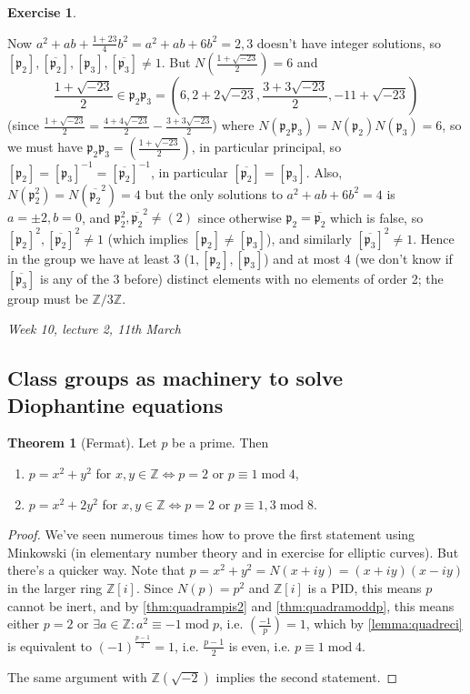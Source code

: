 \documentclass{article}
\newcommand{\Z}{\mathbb{Z}}
\newcommand{\Mod}{\operatorname{mod}}
\newcommand{\ip}{\mathfrak{p}}
\theoremstyle{definition}
\newtheorem{thm}[defn]{Theorem}
\newtheorem{exe}[defn]{Exercise}
\begin{document}
\begin{exe}
\begin{enumerate}
Now $a^2+ab+\frac{1+23}{4}b^2=a^2+ab+6b^2=2,3$ doesn't have integer solutions, so $[\ip_2],[\overline{\ip_2}],[\ip_3],[\overline{\ip_3}]\neq 1$. But $N\left(\frac{1+\sqrt{-23}}{2}\right)=6$ and
\[
\frac{1+\sqrt{-23}}{2}\in\ip_2\ip_3=\left(6,2+2\sqrt{-23},\frac{3+3\sqrt{-23}}{2},-11+\sqrt{-23}\right)
\]
(since $\frac{1+\sqrt{-23}}{2}=\frac{4+4\sqrt{-23}}{2}-\frac{3+3\sqrt{-23}}{2}$)
where $N(\ip_2\ip_3)=N(\ip_2)N(\ip_3)=6$, so we must have $\ip_2\ip_3=\left(\frac{1+\sqrt{-23}}{2}\right)$, in particular principal, so $[\ip_2]=[\ip_3]^{-1}=[\overline{\ip_2}]^{-1}$, in particular $[\overline{\ip_2}]=[\ip_3]$. Also, $N(\ip_2^2)=N(\overline{\ip_2}^2)=4$ but the only solutions to $a^2+ab+6b^2=4$ is $a=\pm 2,b=0$, and $\ip_2^2,\overline{\ip_2}^2\neq (2)$ since otherwise $\ip_2=\overline{\ip_2}$ which is false, so $[\ip_2]^2,[\overline{\ip_2}]^2\neq 1$ (which implies $[\ip_2]\neq [\ip_3]$), and similarly $[\overline{\ip_3}]^2\neq 1$. Hence in the group we have at least 3 ($1,[\ip_2],[\ip_3]$) and at most 4 (we don't know if $[\overline{\ip_3}]$ is any of the 3 before) distinct elements with no elements of order 2; the group must be $\Z/3\Z$.
\end{enumerate}
\end{exe}

\begin{flushright}
\textit{Week 10, lecture 2, 11th March}
\end{flushright}

\subsection{Class groups as machinery to solve Diophantine equations}
\begin{thm}[Fermat]
Let $p$ be a prime. Then
\begin{enumerate}
\item $p=x^2+y^2$ for $x,y\in\Z\iff p=2$ or $p\equiv 1\Mod 4$,
\item $p=x^2+2y^2$ for $x,y\in\Z\iff p=2$ or $p\equiv 1,3\Mod 8$.
\end{enumerate}
\end{thm}
\begin{proof}
We've seen numerous times how to prove the first statement using Minkowski (in elementary number theory and in exercise for elliptic curves). But there's a quicker way. Note that $p=x^2+y^2=N(x+iy)=(x+iy)(x-iy)$ in the larger ring $\Z[i]$. Since $N(p)=p^2$ and $\Z[i]$ is a PID, this means $p$ cannot be inert, and by \ref{thm:quadrampis2} and \ref{thm:quadramoddp}, this means either $p=2$ or $\exists a\in\Z:a^2\equiv -1\Mod p$, i.e. $\left(\frac{-1}{p}\right)=1$, which by \ref{lemma:quadreci} is equivalent to $(-1)^{\frac{p-1}{2}}=1$, i.e. $\frac{p-1}{2}$ is even, i.e. $p\equiv 1\Mod 4$.

The same argument with $\Z\left(\sqrt{-2}\right)$ implies the second statement.
\end{proof}
\end{document}
